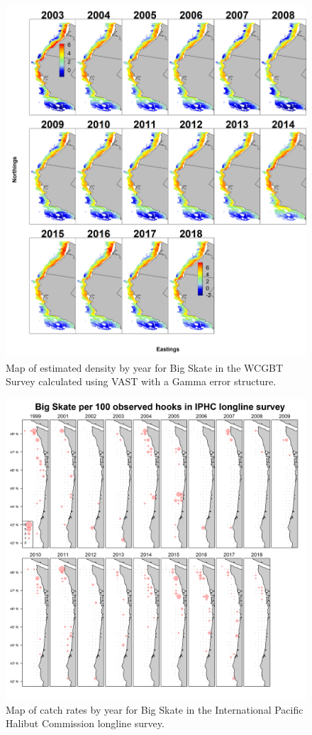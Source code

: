 \documentclass[12pt,]{article}
\begin{document}
\begin{figure}
\centering
\includegraphics{Figures/VAST_Yearly_Dens_WCGBTS.png}
\caption{Map of estimated density by year for Big Skate in the WCGBT
Survey calculated using VAST with a Gamma error structure.
\label{fig:VAST_Yearly_Dens_WCGBTS}}
\end{figure}

\begin{figure}
\centering
\includegraphics{Figures/IPHC_BigSkate_map.png}
\caption{Map of catch rates by year for Big Skate in the International
Pacific Halibut Commission longline survey. \label{fig:IPHC_map}}
\end{figure}
\end{document}
